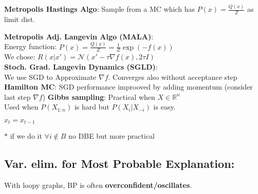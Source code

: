 \textbf{Metropolis Hastings Algo}: Sample from a MC which has $P(x) = \frac{Q(x)}{Z}$ as limit dist.\\
\begin{algorithm}[H]
 \end{algorithm}
\textbf{Metropolis Adj. Langevin Algo (MALA)}:\\
Energy function: $P(x)=\frac{Q(x)}{Z}=\frac{1}{Z}\exp{(-f(x))}$\\
We chose: $R(x\vert x') = \mathcal{N}(x' - \tau \nabla f(x), 2\tau I)$\\
\textbf{Stoch. Grad. Langevin Dynamics (SGLD)}:\\
We use SGD to Approximate $\nabla f$. Converges also without acceptance step \\
\textbf{Hamilton MC}: SGD performance improoved by adding momentum (consider last step $\nabla f$)
\textbf{Gibbs sampling}: Practical when $X\in\mathbb{R}^n$\\
Used when $P(X_{1:n})$ is hard but $P(X_i\vert X_{-i})$ is easy.
\begin{algorithm}[H]
    {
        $x_t = x_{t-1}$\\

    }
\end{algorithm}
$*$ if we do it $\forall i \notin B$ no DBE but more practical


\subsection{Var. elim. for Most Probable Explanation:}
With loopy graphs, BP is often \textbf{overconfident/oscillates}.

